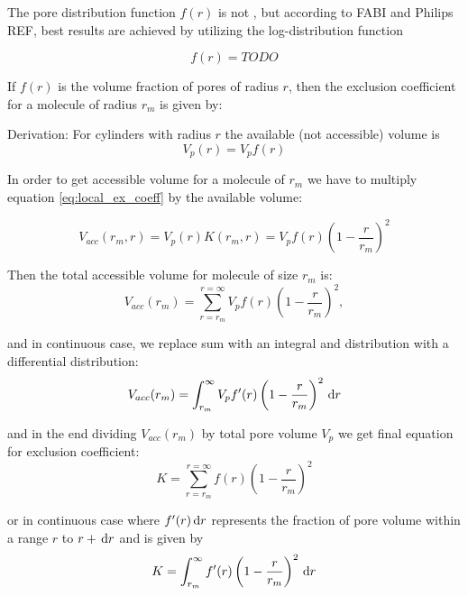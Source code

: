 The pore distribution function $f(r)$ is not , but according to FABI and
Philips REF, best results are achieved by utilizing the log-distribution function

\begin{equation}
    f(r) = TODO
\end{equation}

If $f(r)$ is the volume fraction of pores of radius $r$, then the exclusion
coefficient for a molecule of radius $r_m$ is given by:

Derivation:
For cylinders with radius $r$ the available (not accessible) volume is
\begin{equation}
    V_p(r) = V_pf(r)
\end{equation}

In order to get accessible volume for a  molecule of $r_m$ we have to multiply
equation \ref{eq:local_ex_coeff} by the available volume:

\begin{equation}
    V_{acc}(r_m, r) = V_p(r) K(r_m, r) = V_p f(r) \left(1-\frac{r}{r_m}\right)^2
\end{equation}

Then the total accessible volume for molecule of size $r_m$ is:
\begin{equation}
    V_{acc}(r_m) = \sum_{r=r_m}^{r=\infty} V_p f(r)
    \left(1-\frac{r}{r_m}\right)^2,
\end{equation}

and in continuous case, we replace sum with an integral and distribution with a
differential distribution:
\begin{equation}
    V_{acc}(r_m) = \int_{r_m}^{\infty} V_p f'(r)
    \left(1-\frac{r}{r_m}\right)^2\,\mathrm{d} r
\end{equation}

and in the end dividing $V_{acc}(r_m)$ by total pore volume $V_p$ we get final
equation for exclusion coefficient:
\begin{equation}
    K = \sum_{r = r_m}^{r = \infty} f(r)\left(1 - \frac{r}{r_m}\right)^2
\end{equation}

or in continuous case where $f'(r)\,\mathrm{d} r$ represents the fraction of pore volume
within a range $r$ to $r+\,\mathrm{d} r$ and is given by
\begin{equation}
    K = \int_{r_m}^{\infty} f'(r)\left(1 - \frac{r}{r_m}\right)^2\,\mathrm{d} r
\end{equation}




\appendix

